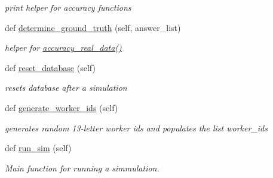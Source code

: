 \begin{DoxyCompactItemize}
\begin{DoxyCompactList}\small\item\em print helper for accuracy functions \end{DoxyCompactList}\item 
def \mbox{\hyperlink{classjoinapp_1_1join__simulations_1_1_join_simulation_ab1fac4122758d122b715f532309a02db}{determine\+\_\+ground\+\_\+truth}} (self, answer\+\_\+list)
\begin{DoxyCompactList}\small\item\em helper for \mbox{\hyperlink{classjoinapp_1_1join__simulations_1_1_join_simulation_a687be0f78243c2019ef987b356d469a4}{accuracy\+\_\+real\+\_\+data()}} \end{DoxyCompactList}\item 
def \mbox{\hyperlink{classjoinapp_1_1join__simulations_1_1_join_simulation_a5af6b7d43daa54fef6fc6580683e5c80}{reset\+\_\+database}} (self)
\begin{DoxyCompactList}\small\item\em resets database after a simulation \end{DoxyCompactList}\item 
def \mbox{\hyperlink{classjoinapp_1_1join__simulations_1_1_join_simulation_ab955f49a4963d78e2bfe7b811a6b4385}{generate\+\_\+worker\+\_\+ids}} (self)
\begin{DoxyCompactList}\small\item\em generates random 13-\/letter worker ids and populates the list worker\+\_\+ids \end{DoxyCompactList}\item 
def \mbox{\hyperlink{classjoinapp_1_1join__simulations_1_1_join_simulation_aafbc405f49645141a30302a448b056dc}{run\+\_\+sim}} (self)
\begin{DoxyCompactList}\small\item\em Main function for running a simmulation. \end{DoxyCompactList}\end{DoxyCompactItemize}
